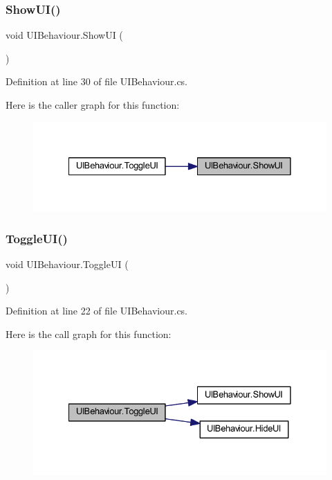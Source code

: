 \subsubsection{\texorpdfstring{ShowUI()}{ShowUI()}}
{\footnotesize\ttfamily void U\+I\+Behaviour.\+Show\+UI (\begin{DoxyParamCaption}{ }\end{DoxyParamCaption})}



Definition at line 30 of file U\+I\+Behaviour.\+cs.

Here is the caller graph for this function\+:
\nopagebreak
\begin{figure}[H]
\begin{center}
\leavevmode
\includegraphics[width=328pt]{class_u_i_behaviour_a14585d2d40b493d7999564d8a51d51c5_icgraph}
\end{center}
\end{figure}
\mbox{\label{class_u_i_behaviour_a508b07927b86c1f75ab1eeb45674f040}} 
\subsubsection{\texorpdfstring{ToggleUI()}{ToggleUI()}}
{\footnotesize\ttfamily void U\+I\+Behaviour.\+Toggle\+UI (\begin{DoxyParamCaption}{ }\end{DoxyParamCaption})}



Definition at line 22 of file U\+I\+Behaviour.\+cs.

Here is the call graph for this function\+:
\nopagebreak
\begin{figure}[H]
\begin{center}
\leavevmode
\includegraphics[width=328pt]{class_u_i_behaviour_a508b07927b86c1f75ab1eeb45674f040_cgraph}
\end{center}
\end{figure}


